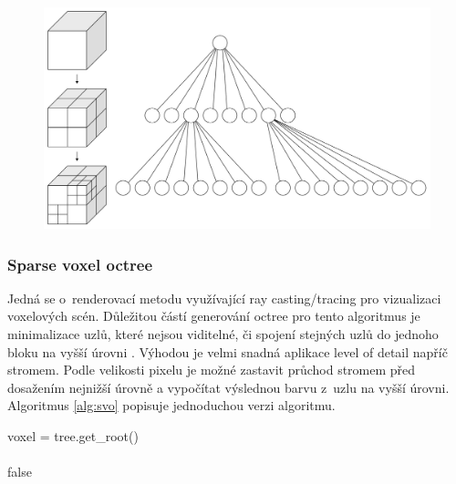 \begin{figure}[H]
	\centering
	\includegraphics[scale=0.12]{obrazky-figures/Octree2.pdf}
	\captionsetup{justification=centering}
	\label{fig:slabs}
\end{figure}


\subsubsection{Sparse voxel octree}\label{svo_alg}
Jedná se o~renderovací metodu využívající ray casting/tracing pro vizualizaci voxelových scén. Důležitou částí generování octree pro tento algoritmus je minimalizace uzlů, které nejsou viditelné, či spojení stejných uzlů do jednoho bloku na vyšší úrovni \cite{Laine2011EfficientSV}. Výhodou je velmi snadná aplikace level of detail napříč stromem. Podle velikosti pixelu je možné zastavit průchod stromem před dosažením nejnižší úrovně a vypočítat výslednou barvu z~uzlu na vyšší úrovni. Algoritmus \ref{alg:svo} popisuje jednoduchou verzi algoritmu.

\begin{center}
	\begin{czechalgorithm}[H] \label{alg:svo}
		voxel = tree.get\_root()\\
		\\
		\KwRet false
		\caption{Sparse voxel octree ray casting}
	\end{czechalgorithm}
\end{center}

